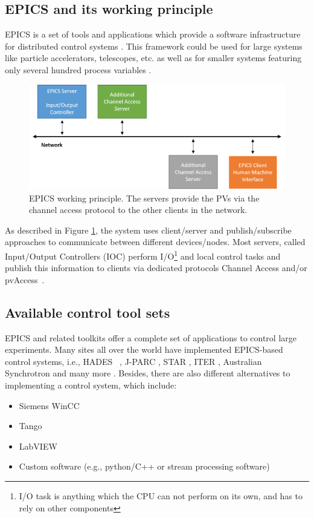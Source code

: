 


\subsection{EPICS and its working principle} 
\label{EPICS}
EPICS is a set of tools and applications which provide a software infrastructure for distributed control systems \cite{EPICS_license}. This framework could be used for large systems like particle accelerators, telescopes, etc. as well as for smaller systems featuring only several hundred process variables \cite{EPICS_1, EPICS_2, EPICS_3, EPICS_4}.
\begin{figure}[!h]
\centering
\includegraphics[width=0.7\columnwidth]{Chapter3/Controls/images/EPICS.png}
\caption{EPICS working principle. The servers provide the \glspl{PV} via the channel access protocol to the other clients in the network.}
\label{fig_EPICS}
\end{figure}

As described in Figure \ref{fig_EPICS}, the system uses client/server and publish/subscribe approaches to communicate between different devices/nodes. Most servers, called Input/Output Controllers (\gls{IOC}) perform I/O\footnote{ I/O task is anything which the CPU can not perform on its own, and has to rely on other components} and local control tasks and publish this information to clients via dedicated protocols Channel Access and/or pvAccess~\cite{EPICS}. 

 \subsection{Available control tool sets}
 EPICS and related toolkits offer a complete set of applications to control large experiments. Many sites all over the world have implemented \gls{EPICS}-based control systems, i.e., \gls{HADES} ~\cite{HADES_EPICS}, \gls{J-PARC} \cite{J-PARC}, \gls{STAR} \cite{STAR}, \gls{ITER} \cite{ITER}, Australian Synchrotron and many more \cite{EPICS_site}. Besides, there are also different alternatives to implementing a control system, which include: 
 \begin{itemize}
     \item Siemens WinCC \cite{Camacho:2022fxa,Goralczyk:2022udx}
     \item Tango \cite{Santander-Vela:2021tma}
     \item LabVIEW \cite{State:2022qlw}
     \item Custom software (e.g., python/C++ or stream processing software) \cite{taurus}
 \end{itemize} 
 
